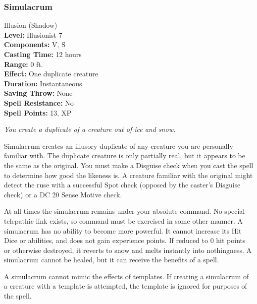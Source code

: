 \subsubsection{Simulacrum}
\label{Spell:Simulacrum}
Illusion (Shadow)
\\ \textbf{Level:} Illusionist 7
\\ \textbf{Components:} V, S
\\ \textbf{Casting Time:} 12 hours
\\ \textbf{Range:} 0 ft.
\\ \textbf{Effect:} One duplicate creature
\\ \textbf{Duration:} Instantaneous
\\ \textbf{Saving Throw:} None
\\ \textbf{Spell Resistance:} No
\\ \textbf{Spell Points:} 13, XP

\emph{You create a duplicate of a creature out of ice and snow.}

Simulacrum creates an illusory duplicate of any creature you are personally familiar with.
The duplicate creature is only partially real, but it appears to be the same as the original.
You must make a Disguise check when you cast the spell to determine how good the likeness is. 
A creature familiar with the original might detect the ruse with a successful Spot check (opposed by the caster's Disguise check) or a DC 20 Sense Motive check.
 
At all times the simulacrum remains under your absolute command. 
No special telepathic link exists, so command must be exercised in some other manner. 
A simulacrum has no ability to become more powerful. 
It cannot increase its Hit Dice or abilities, and does not gain experience points. 
If reduced to 0 hit points or otherwise destroyed, it reverts to snow and melts instantly into nothingness. 
A simulacrum cannot be healed, but it can receive the benefits of a  spell.

A simulacrum cannot mimic the effects of templates.
If creating a simulacrum of a creature with a template is attempted, the template is ignored for purposes of the spell.

